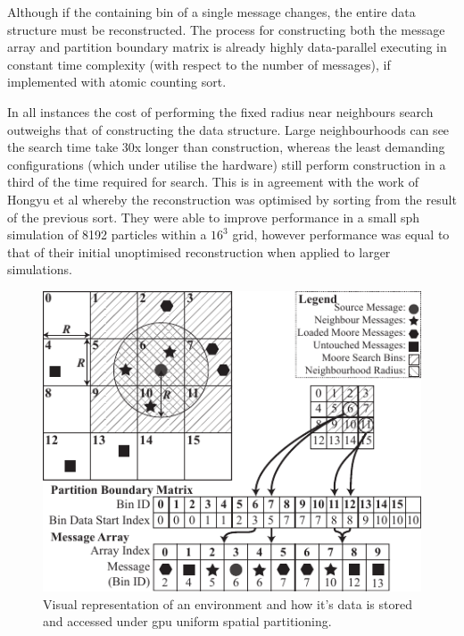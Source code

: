 Although if the containing bin of a single message changes, the entire data structure must be reconstructed. The process for constructing both the message array and partition boundary matrix is already highly data-parallel executing in constant time complexity (with respect to the number of messages), if implemented with atomic counting sort.

In all instances the cost of performing the fixed radius near neighbours search outweighs that of constructing the data structure. Large neighbourhoods can see the search time take 30x longer than construction, whereas the least demanding configurations (which under utilise the hardware) still perform construction in a third of the time required for search. This is in agreement with the work of Hongyu et al whereby the reconstruction was optimised by sorting from the result of the previous sort\cite{HY*15}. They were able to improve performance in a small \gls{sph} simulation of 8192 particles within a $16^{3}$ grid, however performance was equal to that of their initial unoptimised reconstruction when applied to larger simulations.

\begin{figure}[!t]
\centering
\includegraphics[width=\linewidth]{../resources/usp/usp.pdf}
\caption{\label{fig:uniform-spatial-partitioning}%
Visual representation of an environment and how it's data is stored and accessed under \gls{gpu} uniform spatial partitioning.
}
\end{figure}

